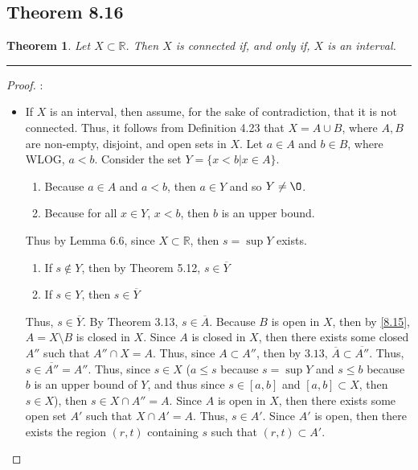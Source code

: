 \documentclass[openany, amssymb, psamsfonts]{amsart}
\newcommand{\bbR}{\mathbb{R}}
\renewcommand{\emptyset}{\O}
\newcommand{\sm}{\setminus}
\newtheorem{thm}{Theorem}[section]
\theoremstyle{definition}
\numberwithin{equation}{section}
\begin{document}
\subsection*{Theorem 8.16}
\begin{thm}
Let $X\subset \bbR$. Then $X$ is connected if, and only if, $X$ is an interval.
\end{thm}
\vspace{4pt}     \hrule   \vspace{4pt} 
\begin{proof}:\\
    \begin{itemize}
        \item If $X$ is an interval, then assume, for the sake of contradiction, that it is not connected. Thus, it follows from Definition 4.23 that $X = A\cup B$, where $A,B$ are non-empty, disjoint, and open sets in $X$. Let $a\in A$ and $b\in B$, where WLOG, $a<b$. Consider the set $Y = \{x<b|x\in A\}$. 
        \begin{enumerate}
            \item Because $a\in A$ and $a<b$, then $a\in Y$ and so $Y\neq \emptyset$.
            \item Because for all $x\in Y$, $x<b$, then $b$ is an upper bound.
        \end{enumerate}
        Thus by Lemma 6.6, since $X\subset \bbR$, then $s=\sup Y$ exists.         \begin{enumerate}
            \item If $s\notin Y$, then by Theorem 5.12, $s\in \overline{Y}$
            \item If $s\in Y$, then $s\in \overline{Y}$
        \end{enumerate}
        Thus, $s\in \overline{Y}$. By Theorem 3.13, $s\in \overline{A}$. Because $B$ is open in $X$, then by \ref{8.15}, $A = X\sm B$ is closed in $X$. Since $A$ is closed in $X$, then there exists some closed $A''$ such that $A''\cap X = A$. Thus, since $A \subset A''$, then by $3.13$, $\overline{A}\subset \overline{A''}$. Thus, $s\in \overline{A''} = A''$. Thus, since $s\in X$ ($a\leq s$ because $s= \sup Y$ and $s\leq b$ because $b$ is an upper bound of $Y$, and thus since $s\in [a,b]$ and $[a,b]\subset X$, then $s\in X$), then $s\in X \cap A'' = A$. Since $A$ is open in $X$, then there exists some open set $A'$ such that $X \cap A' = A$. Thus, $s\in A'$. Since $A'$ is open, then there exists the region $(r,t)$ containing $s$ such that $(r,t)\subset A'$. 
               \begin{enumerate}

\end{enumerate}
\end{itemize}
\end{proof}
\end{document}
